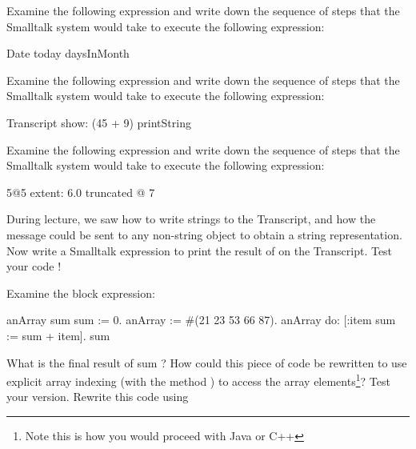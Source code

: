 \exercise Examine the following expression and write down the sequence of steps that the Smalltalk system would take to execute the following expression:
\begin{scode}
Date today daysInMonth
\end{scode}
\exercise Examine the following expression and write down the
sequence of steps that the Smalltalk system would take to execute
the following expression:
\begin{scode}
Transcript show: (45 + 9) printString
\end{scode}
\exercise Examine the following expression and write down the
sequence of steps that the Smalltalk system would take to execute
the following expression:
\begin{scode}
5@5 extent: 6.0 truncated @ 7
\end{scode}
\exercise During lecture, we saw how to write strings to the
Transcript, and how the message  could be sent
to any non-string object to obtain a string representation. Now
write a Smalltalk expression to print the result of  on the Transcript. Test your code !

\newpage
\exercise Examine the block expression:

\begin{scode}
\stBar anArray sum \stBar
sum := 0.
anArray := \#(21 23 53 66 87).
anArray do: [:item \stBar sum := sum + item].
sum
\end{scode}

What is the final result of sum ? How could this piece of code be
rewritten to use explicit array indexing (with the method
 ) to access the array elements\footnote{Note this is
how you would proceed with Java or C++}? Test your version.
Rewrite this code using 


\ifx\wholebook\relax\else\fi
